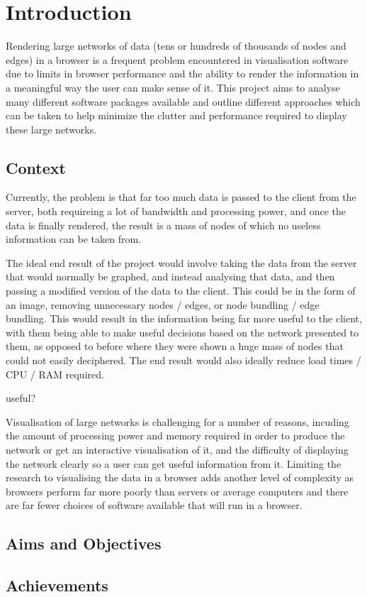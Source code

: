 \documentclass[../dissertation.tex]{subfiles}
\begin{document}
\chapter{Introduction}

Rendering large networks of data (tens or hundreds of thousands of nodes and edges) in a browser is a frequent problem encountered in visualisation software due to limits in browser performance and the ability to render the information in a meaningful way the user can make sense of it. This project aims to analyse many different software packages available and outline different approaches which can be taken to help minimize the clutter and performance required to display these large networks. 
 
\section{Context}
Currently, the problem is that far too much data is passed to the client from the server, both requireing a lot of bandwidth and processing power, and once the data is finally rendered, the result is a mass of nodes of which no useless information can be taken from. 

The ideal end result of the project would involve taking the data from the server that would normally be graphed, and instead analysing that data, and then passing a modified version of the data to the client. This could be in the form of an image, removing unnecessary nodes / edges, or node bundling / edge bundling. This would result in the information being far more useful to the client, with them being able to make useful decisions based on the network presented to them, as opposed to before where they were shown a huge mass of nodes that could not easily deciphered. The end result would also ideally reduce load times / CPU / RAM required. 

useful? 

Visualisation of large networks is challenging for a number of reasons, incuding the amount of processing power and memory required in order to produce the network or get an interactive visualisation of it, and the difficulty of displaying the network clearly so a user can get useful information from it. Limiting the research to visualising the data in a browser adds another level of complexity as browsers perform far more poorly than servers or average computers and there are far fewer choices of software available that will run in a browser.

\section{Aims and Objectives}



\section{Achievements}



\end{document}
